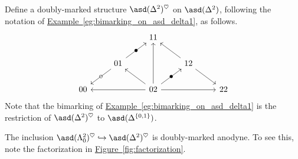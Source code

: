 \documentclass[main.tex]{subfiles}
\begin{document}
\begin{example}
  \label{eg:bimarking_on_asd_delta2}
  Define a doubly-marked structure $\asd(\Delta^{2})^{\heartsuit}$ on $\asd(\Delta^{2})$, following the notation of \hyperref[eg:bimarking_on_asd_delta1]{Example~\ref*{eg:bimarking_on_asd_delta1}}, as follows.
  \begin{equation*}
    \begin{tikzcd}
      && 11
      \\
      & 01
      \arrow[ur, "\bullet" marking]
      \arrow[dl, "\circ" marking]
      && 12
      \arrow[ul]
      \arrow[dr]
      \\
      00
      && 02
      \arrow[ll]
      \arrow[rr]
      \arrow[uu]
      \arrow[ur, "\bullet" marking]
      \arrow[ul]
      && 22
    \end{tikzcd}
  \end{equation*}
  Note that the bimarking of \hyperref[eg:bimarking_on_asd_delta1]{Example~\ref*{eg:bimarking_on_asd_delta1}} is the restriction of $\asd(\Delta^{2})^{\heartsuit}$ to $\asd(\Delta^{\{0, 1\}})$. %

  The inclusion $\asd(\Lambda^{2}_{0})^{\heartsuit} \hookrightarrow \asd(\Delta^{2})^{\heartsuit}$ is doubly-marked anodyne. To see this, note the factorization in \hyperref[fig:factorization]{Figure~\ref*{fig:factorization}}.


\end{example}
\end{document}
